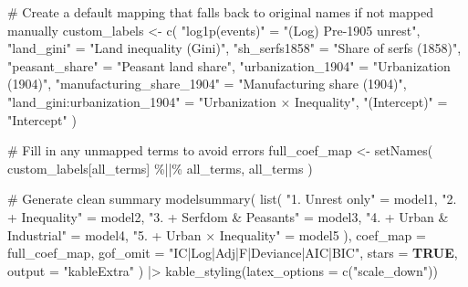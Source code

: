 \documentclass[
  11pt,
  letterpaper,
  DIV=11,
  numbers=noendperiod]{scrartcl}
\newenvironment{Shaded}{\begin{snugshade}}{\end{snugshade}}
\newcommand{\AttributeTok}[1]{\textcolor[rgb]{0.16,0.50,0.73}{#1}}
\newcommand{\CommentTok}[1]{\textcolor[rgb]{0.48,0.49,0.49}{#1}}
\newcommand{\ConstantTok}[1]{\textcolor[rgb]{0.15,0.68,0.68}{\textbf{#1}}}
\newcommand{\FunctionTok}[1]{\textcolor[rgb]{0.56,0.27,0.68}{#1}}
\newcommand{\NormalTok}[1]{\textcolor[rgb]{0.81,0.81,0.76}{#1}}
\newcommand{\OtherTok}[1]{\textcolor[rgb]{0.15,0.68,0.38}{#1}}
\newcommand{\SpecialCharTok}[1]{\textcolor[rgb]{0.24,0.68,0.91}{#1}}
\newcommand{\StringTok}[1]{\textcolor[rgb]{0.96,0.31,0.31}{#1}}
\begin{document}
\begin{Shaded}
\begin{Highlighting}[]
\CommentTok{\# Create a default mapping that falls back to original names if not mapped manually}
\NormalTok{custom\_labels }\OtherTok{\textless{}{-}} \FunctionTok{c}\NormalTok{(}
  \StringTok{"log1p(events)"} \OtherTok{=} \StringTok{"(Log) Pre{-}1905 unrest"}\NormalTok{,}
  \StringTok{"land\_gini"} \OtherTok{=} \StringTok{"Land inequality (Gini)"}\NormalTok{,}
  \StringTok{"sh\_serfs1858"} \OtherTok{=} \StringTok{"Share of serfs (1858)"}\NormalTok{,}
  \StringTok{"peasant\_share"} \OtherTok{=} \StringTok{"Peasant land share"}\NormalTok{,}
  \StringTok{"urbanization\_1904"} \OtherTok{=} \StringTok{"Urbanization (1904)"}\NormalTok{,}
  \StringTok{"manufacturing\_share\_1904"} \OtherTok{=} \StringTok{"Manufacturing share (1904)"}\NormalTok{,}
  \StringTok{"land\_gini:urbanization\_1904"} \OtherTok{=} \StringTok{"Urbanization × Inequality"}\NormalTok{,}
  \StringTok{"(Intercept)"} \OtherTok{=} \StringTok{"Intercept"}
\NormalTok{)}

\CommentTok{\# Fill in any unmapped terms to avoid errors}
\NormalTok{full\_coef\_map }\OtherTok{\textless{}{-}} \FunctionTok{setNames}\NormalTok{(}
\NormalTok{  custom\_labels[all\_terms] }\SpecialCharTok{\%||\%}\NormalTok{ all\_terms,}
\NormalTok{  all\_terms}
\NormalTok{)}

\CommentTok{\# Generate clean summary}
\FunctionTok{modelsummary}\NormalTok{(}
  \FunctionTok{list}\NormalTok{(}
    \StringTok{"1. Unrest only"} \OtherTok{=}\NormalTok{ model1,}
    \StringTok{"2. + Inequality"} \OtherTok{=}\NormalTok{ model2,}
    \StringTok{"3. + Serfdom \& Peasants"} \OtherTok{=}\NormalTok{ model3,}
    \StringTok{"4. + Urban \& Industrial"} \OtherTok{=}\NormalTok{ model4,}
    \StringTok{"5. + Urban × Inequality"} \OtherTok{=}\NormalTok{ model5}
\NormalTok{  ),}
  \AttributeTok{coef\_map =}\NormalTok{ full\_coef\_map,}
  \AttributeTok{gof\_omit =} \StringTok{"IC|Log|Adj|F|Deviance|AIC|BIC"}\NormalTok{,}
  \AttributeTok{stars =} \ConstantTok{TRUE}\NormalTok{,}
  \AttributeTok{output =} \StringTok{"kableExtra"}
\NormalTok{) }\SpecialCharTok{|\textgreater{}} 
  \FunctionTok{kable\_styling}\NormalTok{(}\AttributeTok{latex\_options =} \FunctionTok{c}\NormalTok{(}\StringTok{"scale\_down"}\NormalTok{))}
\end{Highlighting}
\end{Shaded}
\end{document}
